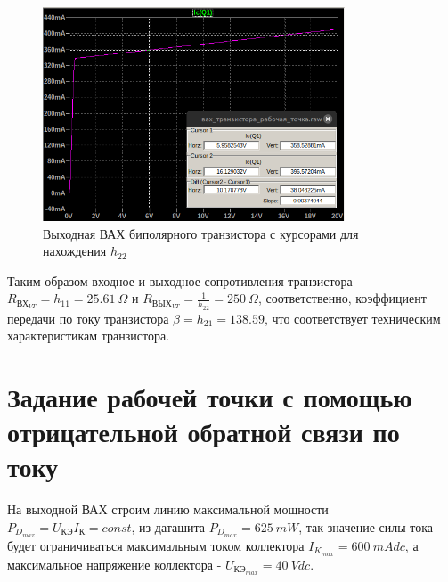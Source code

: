 \begin{figure}[H]
    \centering
    \includegraphics[width=0.8\textwidth]{figs/h22.png}
    \caption{Выходная ВАХ биполярного транзистора с курсорами для нахождения $h_{22}$}
    \label{fig:h22}
\end{figure}

Таким образом входное и выходное сопротивления транзистора
$R_{\text{ВХ}_{VT}}=h_{11}=25.61\ \Omega$ и $R_{\text{ВЫХ}_{VT}}=\frac{1}{h_{22}}=250\ \Omega$,
соответственно, коэффициент передачи по току транзистора $\beta=h_{21}=138.59$, что соответствует
техническим характеристикам транзистора.




\section*{Задание рабочей точки с помощью отрицательной
обратной связи по току}

На выходной ВАХ строим линию максимальной мощности $P_{D_{max}}=U_\text{КЭ}I_\text{К}=const$,
из даташита $P_{D_{max}}=625\ mW$, так значение силы тока будет ограничиваться максимальным
током коллектора $I_{K_{max}}=600\ mAdc$, а максимальное напряжение коллектора - $U_\text{КЭ$_{max}$}=40\ Vdc$.

